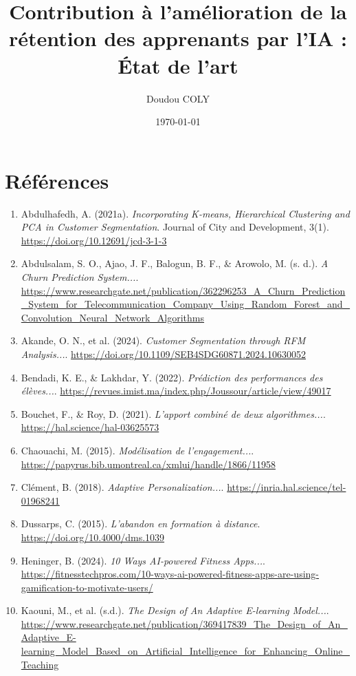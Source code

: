 \documentclass[12pt]{article}
\title{Contribution à l’amélioration de la rétention des apprenants par l’IA : État de l’art}
\author{Doudou COLY}
\date{\today}
\begin{document}
\maketitle


\section{Références}
\begin{enumerate}
  \item Abdulhafedh, A. (2021a). \textit{Incorporating K-means, Hierarchical Clustering and PCA in Customer Segmentation}. Journal of City and Development, 3(1). \url{https://doi.org/10.12691/jcd-3-1-3}
  \item Abdulsalam, S. O., Ajao, J. F., Balogun, B. F., \& Arowolo, M. (s. d.). \textit{A Churn Prediction System...}. \url{https://www.researchgate.net/publication/362296253_A_Churn_Prediction_System_for_Telecommunication_Company_Using_Random_Forest_and_Convolution_Neural_Network_Algorithms}
  \item Akande, O. N., et al. (2024). \textit{Customer Segmentation through RFM Analysis...}. \url{https://doi.org/10.1109/SEB4SDG60871.2024.10630052}
  \item Bendadi, K. E., \& Lakhdar, Y. (2022). \textit{Prédiction des performances des élèves...}. \url{https://revues.imist.ma/index.php/Joussour/article/view/49017}
  \item Bouchet, F., \& Roy, D. (2021). \textit{L’apport combiné de deux algorithmes...}. \url{https://hal.science/hal-03625573}
  \item Chaouachi, M. (2015). \textit{Modélisation de l’engagement...}. \url{https://papyrus.bib.umontreal.ca/xmlui/handle/1866/11958}
  \item Clément, B. (2018). \textit{Adaptive Personalization...}. \url{https://inria.hal.science/tel-01968241}
  \item Dussarps, C. (2015). \textit{L’abandon en formation à distance}. \url{https://doi.org/10.4000/dms.1039}
  \item Heninger, B. (2024). \textit{10 Ways AI-powered Fitness Apps...}. \url{https://fitnesstechpros.com/10-ways-ai-powered-fitness-apps-are-using-gamification-to-motivate-users/}
  \item Kaouni, M., et al. (s.d.). \textit{The Design of An Adaptive E-learning Model...}. \url{https://www.researchgate.net/publication/369417839_The_Design_of_An_Adaptive_E-learning_Model_Based_on_Artificial_Intelligence_for_Enhancing_Online_Teaching}

\end{enumerate}
\end{document}

